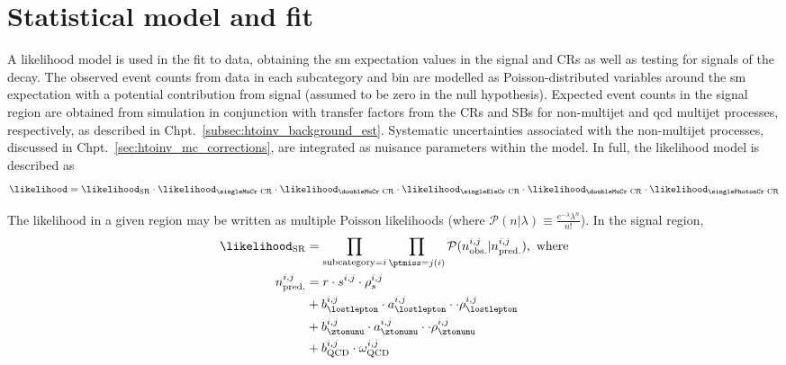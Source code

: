 \section{Statistical model and fit}
\label{sec:htoinv_satistical_treatment}

A likelihood model is used in the fit to data, obtaining the \acrlong{sm} expectation values in the signal and \glspl{CR} as well as testing for signals of the \higgstoinv decay. The observed event counts from data in each subcategory and \ptmiss bin are modelled as Poisson-distributed variables around the \acrshort{sm} expectation with a potential contribution from signal (assumed to be zero in the null hypothesis). Expected event counts in the signal region are obtained from simulation in conjunction with transfer factors from the \glspl{CR} and \glspl{SB} for non-multijet and \acrshort{qcd} multijet processes, respectively, as described in Chpt.~\ref{subsec:htoinv_background_est}. Systematic uncertainties associated with the non-multijet processes, discussed in Chpt.~\ref{sec:htoinv_mc_corrections}, are integrated as nuisance parameters within the model. In full, the likelihood model is described as
\begin{equation}
    \likelihood = \likelihood_{\mathrm{SR}} \cdot \likelihood_{\text{\singleMuCr CR}} \cdot \likelihood_{\text{\doubleMuCr CR}} \cdot \likelihood_{\text{\singleEleCr CR}} \cdot \likelihood_{\text{\doubleMuCr CR}} \cdot \likelihood_{\text{\singlePhotonCr CR}}
    \label{eq:likelihood_overall}
\end{equation}

The likelihood in a given region may be written as multiple Poisson likelihoods (where $\mathcal{P}(n | \lambda) \equiv \frac{ e^{-\lambda} \lambda^n }{n!}$). In the signal region,
\begin{equation}
    \begin{aligned}
\likelihood_{\mathrm{SR}} &= \prod_{\mathrm{subcategory} = i} \prod_{\ptmiss = j(i)} \mathcal{P}(n_{\mathrm{obs.}}^{i, j} | n_{\mathrm{pred.}}^{i, j}), \ \text{where}\\
n_{\mathrm{pred.}}^{i, j} &= r \cdot s^{i, j} \cdot \rho_s^{i, j}\\
&+ b_{\lostlepton}^{i, j} \cdot a_{\lostlepton}^{i, j} \cdot \cdot \rho_{\lostlepton}^{i, j}\\
&+ b_{\ztonunu}^{i, j} \cdot a_{\ztonunu}^{i, j} \cdot \cdot \rho_{\ztonunu}^{i, j}\\
&+ b_{\mathrm{QCD}}^{i, j} \cdot \omega_{\mathrm{QCD}}^{i, j}
    \end{aligned}
    \label{eq:likelihood_SR}
\end{equation}

